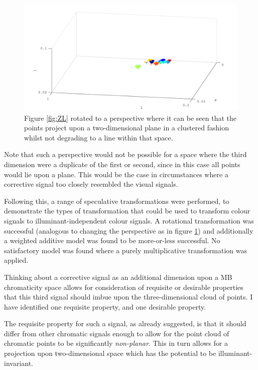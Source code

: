 \begin{figure}[htbp]
 \includegraphics[max width=\textwidth]{figs/comp/melcomp_2_caller/viewpoint.pdf}
 \caption{Figure \ref{fig:ZL} rotated to a perspective where it can be seen that the points project upon a two-dimensional plane in a clustered fashion whilst not degrading to a line within that space.}
 \label{fig:viewpoint}
\end{figure} 

Note that such a perspective would not be possible for a space where the third dimension were a duplicate of the first or second, since in this case all points would lie upon a plane. This would be the case in circumstances where a corrective signal too closely resembled the visual signals.

Following this, a range of speculative transformations were performed, to demonstrate the types of transformation that could be used to transform colour signals to illuminant-independent colour signals. A rotational transformation was successful (analogous to changing the perspective as in figure \ref{fig:viewpoint}) and additionally a weighted additive model was found to be more-or-less successful. No satisfactory model was found where a purely multiplicative transformation was applied.

Thinking about a corrective signal as an additional dimension upon a \gls{MB} chromaticity space allows for consideration of requisite or desirable properties that this third signal should imbue upon the three-dimensional cloud of points. I have identified one requisite property, and one desirable property. 

The requisite property for such a signal, as already suggested, is that it should differ from other chromatic signals enough to allow for the point cloud of chromatic points to be significantly \emph{non-planar}. This in turn allows for a projection upon two-dimensional space which has the potential to be illuminant-invariant.

